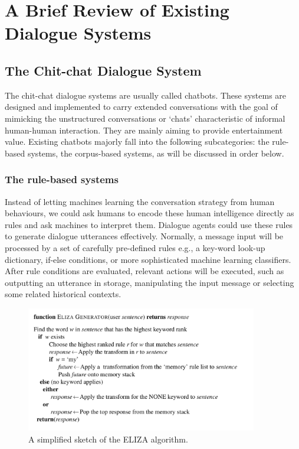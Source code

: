 \documentclass[bsc,frontabs,twoside,singlespacing,parskip,deptreport]{infthesis}     %
\begin{document}
\section {A Brief Review of Existing Dialogue Systems}

\subsection{The Chit-chat Dialogue System}

The chit-chat dialogue systems are usually called chatbots. These systems are designed and implemented to carry extended conversations with the goal of mimicking the unstructured conversations or ‘chats’ characteristic of informal human-human interaction. They are mainly aiming to provide entertainment value. Existing chatbots majorly fall into the following subcategories: the rule-based systems, the corpus-based systems, as will be discussed in order below.

\subsubsection*{The rule-based systems}

Instead of letting machines learning the conversation strategy from human behaviours, we could ask humans to encode these human intelligence directly as rules and ask machines to interpret them. Dialogue agents could use these rules to generate dialogue utterances effectively. Normally, a message input will be processed by a set of carefully pre-defined rules e.g., a key-word look-up dictionary, if-else conditions, or more sophisticated machine learning classifiers. After rule conditions are evaluated, relevant actions will be executed, such as outputting an utterance in storage, manipulating the input message or selecting some related historical contexts.

\begin{figure}[h]
    \centering
    \includegraphics[width=0.9\textwidth]{elizarule.jpeg}
    \caption{A simplified sketch of the ELIZA algorithm.}
    \label{fig:elizarule}
\end{figure}
\end{document}
